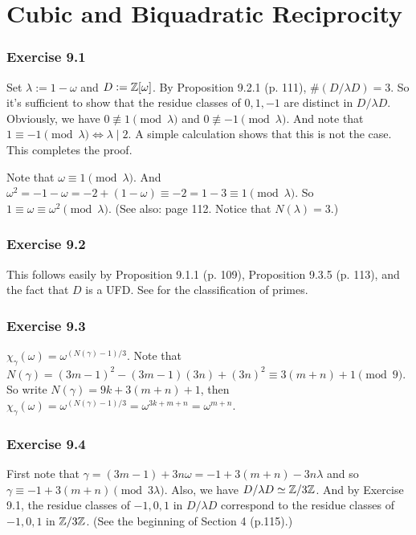 \documentclass[../I&R.tex]{subfiles}
\begin{document}
\chapter{Cubic and Biquadratic Reciprocity}

\subsection*{Exercise 9.1}

Set $\lambda:=1-\omega$ and $D:=\mathbb{Z}[\omega]$. By Proposition 9.2.1 (p. 111), $\#(D/\lambda D)=3$. So it's sufficient to show that the residue classes of $0,1,-1$ are distinct in $D/\lambda D$. Obviously, we have $0\not\equiv1\pmod{\lambda}$ and $0\not\equiv-1\pmod{\lambda}$. And note that $1\equiv-1\pmod{\lambda} \iff \lambda\mid2$. A simple calculation shows that this is not the case. This completes the proof.

Note that $\omega\equiv1\pmod{\lambda}$. And $\omega^2=-1-\omega=-2+(1-\omega)\equiv-2=1-3\equiv1\pmod{\lambda}$. So $1\equiv\omega\equiv\omega^2\pmod{\lambda}$. (See also: page 112. Notice that $N(\lambda)=3$.)

\subsection*{Exercise 9.2}

This follows easily by Proposition 9.1.1 (p. 109), Proposition 9.3.5 (p. 113), and the fact that $D$ is a UFD. See  for the classification of primes.

\subsection*{Exercise 9.3}

$\chi_\gamma(\omega)=\omega^{(N(\gamma)-1)/3}$. Note that $N(\gamma)=(3m-1)^2-(3m-1)(3n)+(3n)^2\equiv3(m+n)+1\pmod{9}$. So write $N(\gamma)=9k+3(m+n)+1$, then $\chi_\gamma(\omega)=\omega^{(N(\gamma)-1)/3}=\omega^{3k+m+n}=\omega^{m+n}$.

\subsection*{Exercise 9.4}

First note that $\gamma=(3m-1)+3n\omega=-1+3(m+n)-3n\lambda$ and so $\gamma\equiv-1+3(m+n) \pmod{3\lambda}$. Also, we have $D/\lambda D\simeq \mathbb{Z}/3\mathbb{Z}$. And by Exercise 9.1, the residue classes of $-1,0,1$ in $D/\lambda D$ correspond to the residue classes of $-1,0,1$ in $\mathbb{Z}/3\mathbb{Z}$. (See the beginning of Section 4 (p.115).)
\end{document}

